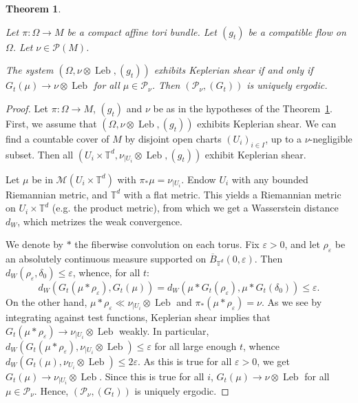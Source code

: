\documentclass[10pt]{amsart}
\newtheorem{theo}{Theorem}[section]
\theoremstyle{definition}\newtheorem{defi}[theo]{Definition}\newtheorem{rema}[theo]{Remark}\newtheorem{exam}[theo]{Example}\newtheorem{exem}[theo]{Example}\newtheorem{nota}[theo]{Notation}
\DeclareMathOperator{\Leb}{Leb}
\newcommand{\Tbb}{\mathbb{T}}
\newcommand{\Mcal}{\mathcal{M}}
\newcommand{\Pcal}{\mathcal{P}}
\begin{document}
\begin{theo}\label{thm:UniqueErgodicite}

Let $\pi : \Omega \to M$ be a compact affine tori bundle. Let $(g_t)$ be a compatible flow on $\Omega$. Let $\nu \in \Pcal (M)$.


The system $(\Omega, \nu \otimes \Leb, (g_t))$ exhibits Keplerian shear if and only if $G_t (\mu) \to \nu \otimes \Leb$ for all $\mu \in \Pcal_\nu$. Then $(\Pcal_\nu, (G_t))$ is uniquely ergodic.
\end{theo}


\begin{proof}%
Let $\pi : \Omega \to M$, $(g_t)$ and $\nu$ be as in the hypotheses of the Theorem~\ref{thm:UniqueErgodicite}. First, we assume that $(\Omega, \nu \otimes \Leb, (g_t))$ exhibits Keplerian shear. We can find a countable cover of $M$ by disjoint open charts $(U_i)_{i \in I}$, up to a $\nu$-negligible subset. Then all $(U_i \times \Tbb^d, \nu_{|U_i} \otimes \Leb, (g_t))$ exhibit Keplerian shear.



Let $\mu$ be in $\Mcal (U_i \times \Tbb^d)$ with $\pi_* \mu = \nu_{|U_i}$. Endow $U_i$ with any bounded Riemannian metric, and $\Tbb^d$ with a flat metric. This yields a Riemannian metric on $U_i \times \Tbb^d$ (e.g. the product metric), from which we get a Wasserstein distance $d_W$, which metrizes the weak convergence.


We denote by $*$ the fiberwise convolution on each torus. Fix $\varepsilon >0$, and let $\rho_\varepsilon$ be an absolutely continuous measure supported on $\overline{B}_{\Tbb^d} (0, \varepsilon)$. Then $d_W (\rho_\varepsilon, \delta_0) \leq \varepsilon$, whence, for all $t$:
\[
d_W (G_t (\mu * \rho_\varepsilon), G_t (\mu)) = d_W (\mu * G_t (\rho_\varepsilon), \mu * G_t (\delta_0))
\leq \varepsilon.
\]
On the other hand, $\mu * \rho_\varepsilon \ll \nu_{|U_i} \otimes \Leb$ and $\pi_* (\mu * \rho_\varepsilon) = \nu$. As we see by integrating against test functions, Keplerian shear implies that $G_t (\mu * \rho_\varepsilon) \to \nu_{|U_i} \otimes \Leb$ weakly. In particular, $d_W (G_t (\mu * \rho_\varepsilon), \nu_{|U_i} \otimes \Leb) \leq \varepsilon$ for all large enough $t$, whence $d_W (G_t(\mu),\nu_{U_i} \otimes \Leb) \leq 2 \varepsilon$. As this is true for all $\varepsilon >0$, we get $G_t(\mu) \to \nu_{|U_i} \otimes \Leb$. Since this is true for all $i$, $G_t (\mu) \to \nu \otimes \Leb$ for all $\mu \in \Pcal_\nu$. Hence, $(\Pcal_\nu, (G_t))$ is uniquely ergodic.


\end{proof}
\end{document}
